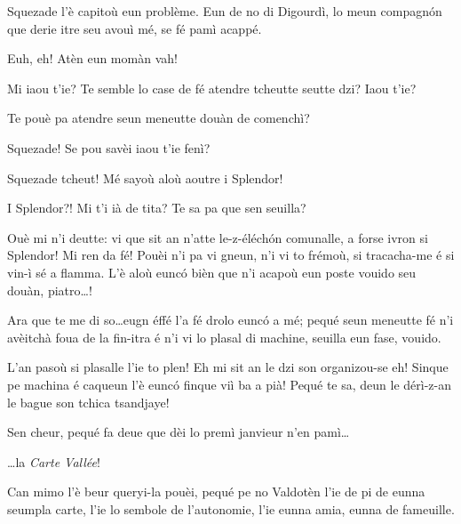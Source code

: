 \begin{drama}

\Pierrespeaks Squezade l'è capitoù eun problème. Eun de no di Digourdì, lo meun compagn\'on que derie itre seu avouì mé, se fé pamì acappé.


\Laurentspeaks Euh, eh! Atèn eun momàn vah!


\Pierrespeaks Mi iaou t'ie? Te semble lo case de fé atendre tcheutte seutte dzi? Iaou t'ie?

\Laurentspeaks {} Te pouè pa atendre seun meneutte douàn de comenchì?

\Pierrespeaks {} Squezade!  Se pou savèi iaou t'ie fenì?

\Laurentspeaks Squezade tcheut! Mé sayoù aloù aoutre i Splendor! 

\Pierrespeaks I Splendor?! Mi t'i ià de tita? Te sa pa que sen seuilla?

\Laurentspeaks Ouè mi n'i deutte: vi que sit an n'atte le-z-éléch\'on comunalle, a forse ivron si Splendor! Mi ren da fé! Pouèi n'i pa vi gneun, n'i vi to frémoù, si tracacha-me é si vin-ì sé a flamma. L'è aloù eunc\'o bièn que n'i acapoù eun poste vouido seu douàn, piatro\ldots !

\Pierrespeaks Ara que te me di so\ldots eugn éffé l'a fé drolo eunc\'o a mé; pequé seun meneutte fé n'i avèitchà foua de la fin-itra é n'i vi lo plasal di machine, seuilla eun fase, vouido.

\Laurentspeaks L'an pasoù si plasalle l'ie to plen! Eh mi sit an le dzi son organizou-se eh! Sinque pe machina é caqueun l'è eunc\'o finque viì ba a pià! Pequé te sa, deun le dérì-z-an le bague son tchica tsandjaye!

\Pierrespeaks Sen cheur, pequé fa deue que dèi lo premì janvieur n'en pamì\ldots


\Laurentspeaks \ldots la \textit{Carte Vallée}!

\Pierrespeaks Can mimo l'è beur queryi-la pouèi, pequé pe no Valdotèn l'ie de pi de eunna seumpla carte, l'ie lo sembole de l'autonomie, l'ie eunna amia, eunna de fameuille.


\end{drama}

